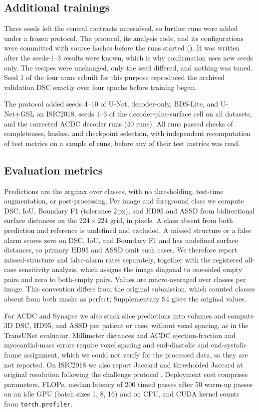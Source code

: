 \documentclass[fleqn,10pt,lineno]{wlpeerj}
\begin{document}
\subsection*{Additional trainings}
Three seeds left the central contrasts unresolved, so further runs were added under a frozen protocol. The protocol, its analysis code, and its configurations were committed with source hashes before the runs started (). It was written after the seeds-1--3 results were known, which is why confirmation uses new seeds only. The recipes were unchanged, only the seed differed, and nothing was tuned. Seed 1 of the four arms rebuilt for this purpose reproduced the archived validation DSC exactly over four epochs before training began.

The protocol added seeds 4--10 of U-Net, decoder-only, BDS-Lite, and U-Net+GSL on ISIC2018, seeds 1--3 of the decoder-plus-surface cell on all datasets, and the corrected ACDC decoder runs (40 runs). All runs passed checks of completeness, hashes, and checkpoint selection, with independent recomputation of test metrics on a sample of runs, before any of their test metrics was read.

\subsection*{Evaluation metrics}
Predictions are the argmax over classes, with no thresholding, test-time augmentation, or post-processing. Per image and foreground class we compute DSC, IoU, Boundary F1 (tolerance 2\,px), and HD95 and ASSD from bidirectional surface distances on the $224\times224$ grid, in pixels. A class absent from both prediction and reference is undefined and excluded. A missed structure or a false alarm scores zero on DSC, IoU, and Boundary F1 and has undefined surface distances, so primary HD95 and ASSD omit such cases. We therefore report missed-structure and false-alarm rates separately, together with the registered all-case sensitivity analysis, which assigns the image diagonal to one-sided empty pairs and zero to both-empty pairs. Values are macro-averaged over classes per image. This convention differs from the original submission, which counted classes absent from both masks as perfect; Supplementary S4 gives the original values.

For ACDC and Synapse we also stack slice predictions into volumes and compute 3D DSC, HD95, and ASSD per patient or case, without voxel spacing, as in the TransUNet evaluator. Millimeter distances and ACDC ejection-fraction and myocardial-mass errors require voxel spacing and end-diastolic and end-systolic frame assignment, which we could not verify for the processed data, so they are not reported. On ISIC2018 we also report Jaccard and thresholded Jaccard at original resolution following the challenge protocol \citep{Codella2019Skin}. Deployment cost comprises parameters, FLOPs, median latency of 200 timed passes after 50 warm-up passes on an idle GPU (batch sizes 1, 8, 16) and on CPU, and CUDA kernel counts from \texttt{torch.profiler}.
\end{document}
